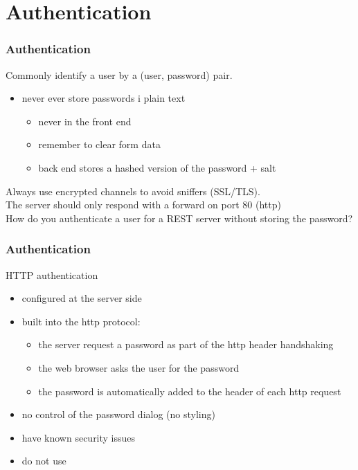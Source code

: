 \section{Authentication}
\begin{frame}[fragile] \frametitle{Authentication}
Commonly identify a user by a (user, password) pair.
\begin{itemize}
  \item never ever store passwords i plain text
  \begin{itemize}
    \item never in the front end
    \item remember to clear form data
    \item back end stores a hashed version of the password + salt
  \end{itemize}
\end{itemize}
\vspace{5mm}
Always use encrypted channels to avoid sniffers (SSL/TLS).
\\ \noindent The server should only respond with a forward on port 80 (http)
\vspace{5mm}
\\How do you authenticate a user for a REST server without storing the password?
\end{frame}

\begin{frame}[fragile] \frametitle{Authentication}
HTTP authentication
\begin{itemize}
  \item configured at the server side
  \item built into the http protocol:
  \begin{itemize}
    \item the server request a password as part of the http header handshaking
    \item the web browser asks the user for the password
    \item the password is automatically added to the header of each http request
  \end{itemize}
  \item no control of the password dialog (no styling)
  \item have known security issues
  \item do not use
\end{itemize}
\vspace{5mm}
\end{frame}

